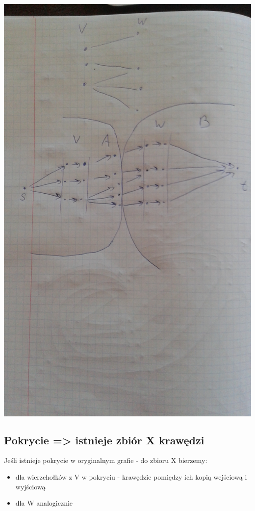 \documentclass[12pt]{article}
\begin{document}
\includegraphics[scale=0.18]{transformA.png}

\subsection{Pokrycie => istnieje zbiór X krawędzi}

Jeśli istnieje pokrycie w oryginalnym grafie - do zbioru X bierzemy:

\begin{itemize}
\item dla wierzchołków z V w pokryciu - krawędzie pomiędzy ich kopią wejściową i wyjściową
\item dla W analogicznie
\end{itemize}
\end{document}
